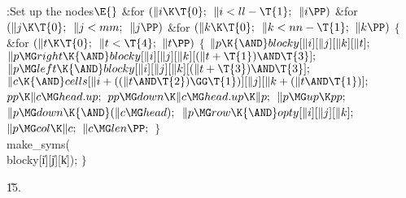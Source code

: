 \B{}:Set up the  nodes\X${}\E{}$\6
\&{for} ${}(\|i\K\T{0};{}$ ${}\|i<\\{ll}-\T{1};{}$ ${}\|i\PP){}$\1\6
\&{for} ${}(\|j\K\T{0};{}$ ${}\|j<\\{mm};{}$ ${}\|j\PP){}$\1\6
\&{for} ${}(\|k\K\T{0};{}$ ${}\|k<\\{nn}-\T{1};{}$ ${}\|k\PP){}$\5
${}\{{}$\1\6
\&{for} ${}(\|t\K\T{0};{}$ ${}\|t<\T{4};{}$ ${}\|t\PP){}$\5
${}\{{}$\1\6
${}\|p\K{\AND}\\{blocky}[\|i][\|j][\|k][\|t];{}$\6
${}\|p\MG\\{right}\K{\AND}\\{blocky}[\|i][\|j][\|k][(\|t+\T{1})\AND\T{3}];{}$\6
${}\|p\MG\\{left}\K{\AND}\\{blocky}[\|i][\|j][\|k][(\|t+\T{3})\AND\T{3}];{}$\6
${}\|c\K{\AND}\\{cells}[\|i+((\|t\AND\T{2})\GG\T{1})][\|j][\|k+(\|t\AND%
\T{1})];{}$\6
${}\\{pp}\K\|c\MG\\{head}.\\{up};{}$\6
${}\\{pp}\MG\\{down}\K\|c\MG\\{head}.\\{up}\K\|p;{}$\6
${}\|p\MG\\{up}\K\\{pp};{}$\6
${}\|p\MG\\{down}\K{\AND}(\|c\MG\\{head});{}$\6
${}\|p\MG\\{row}\K{\AND}\\{opty}[\|i][\|j][\|k];{}$\6
${}\|p\MG\\{col}\K\|c;{}$\6
${}\|c\MG\\{len}\PP;{}$\6
\4${}\}{}$\2\6
\\{make\_syms}(\\{blocky}[\|i][\|j][\|k]);\6
\4${}\}{}$\2\2\2\par
\U15.\fi

